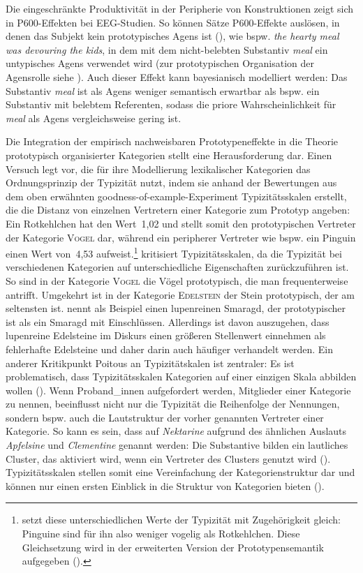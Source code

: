 Die eingeschränkte Produktivität in der Peripherie von Konstruktionen zeigt sich in P600-Effekten bei EEG-Studien. So können Sätze P600-Effekte auslösen, in denen das Subjekt kein prototypisches Agens ist (\cite[157]{Gouvea.2010}), wie bspw. \textit{the hearty meal was devouring the kids}, in dem mit dem nicht-belebten Substantiv \textit{meal} ein untypisches Agens verwendet wird (zur prototypischen Organisation der Agensrolle siehe \cite[64--66]{Lakoff.1987}). Auch dieser Effekt kann bayesianisch modelliert werden: Das Substantiv \textit{meal} ist als Agens weniger semantisch erwartbar als bspw. ein Substantiv mit belebtem Referenten, sodass die priore Wahrscheinlichkeit für \textit{meal} als Agens vergleichsweise gering ist.

Die Integration der empirisch nachweisbaren Prototypeneffekte in die Theorie prototypisch organisierter Kategorien stellt eine Herausforderung dar. Einen Versuch legt \textcite[198]{Rosch.1975b} vor, die für ihre Modellierung lexikalischer Kategorien das Ordnungsprinzip der Typizität nutzt, indem sie anhand der Bewertungen aus dem oben erwähnten goodness-of-example-Experiment Typizitätsskalen erstellt, die die Distanz von einzelnen Vertretern einer Kategorie zum Prototyp angeben: Ein Rotkehlchen hat den Wert~1,02 und stellt somit den prototypischen Vertreter der Kategorie \textsc{Vogel} dar, während ein peripherer Vertreter wie bspw. ein Pinguin einen Wert von~4,53 aufweist.\footnote{\textcite[458--459]{Lakoff.1973} setzt diese unterschiedlichen Werte der Typizität mit Zugehörigkeit gleich: Pinguine sind für ihn also weniger vogelig als Rotkehlchen. Diese Gleichsetzung wird in der erweiterten Version der Prototypensemantik aufgegeben (\cite[112]{Kleiber.1993}).} \textcite[7--9]{Poitou.2004b} kritisiert Typizitätsskalen, da die Typizität bei verschiedenen Kategorien auf unterschiedliche Eigenschaften zurückzuführen ist. So sind in der Kategorie \textsc{Vogel} die Vögel prototypisch, die man frequenterweise antrifft. Umgekehrt ist in der Kategorie \textsc{Edelstein} der Stein prototypisch, der am seltensten ist. \textcite[9]{Poitou.2004b} nennt als Beispiel einen lupenreinen Smaragd, der prototypischer ist als ein Smaragd mit Einschlüssen. Allerdings ist davon auszugehen, dass lupenreine Edelsteine im Diskurs einen größeren Stellenwert einnehmen als fehlerhafte Edelsteine und daher darin auch häufiger verhandelt werden. Ein anderer Kritikpunkt Poitous an Typizitätskalen ist zentraler: Es ist problematisch, dass Typizitätsskalen Kategorien auf einer einzigen Skala abbilden wollen (\cite[1--3]{Poitou.2004b}). Wenn Proband\_innen aufgefordert werden, Mitglieder einer Kategorie zu nennen, beeinflusst nicht nur die Typizität die Reihenfolge der Nennungen, sondern bspw. auch die Lautstruktur der vorher genannten Vertreter einer Kategorie. So kann es sein, dass auf \textit{Nektarine} aufgrund des ähnlichen Auslauts \textit{Apfelsine} und \textit{Clementine} genannt werden: Die Substantive bilden ein lautliches Cluster, das aktiviert wird, wenn ein Vertreter des Clusters genutzt wird (\cite[62--65]{Goldberg.2019}). Typizitätsskalen stellen somit eine Vereinfachung der Kategorienstruktur dar und können nur einen ersten Einblick in die Struktur von Kategorien bieten (\cite[2--3]{Poitou.2004b}).

